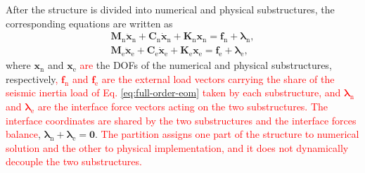 \documentclass[11pt,a4paper]{article}
\numberwithin{equation}{section}
\newcommand{\rev}[1]{\textcolor{red}{#1}}
\begin{document}
After the structure is divided into numerical and physical substructures, the corresponding equations are written as
\begin{subequations}
	\label{eq:substructure-eom}
	\begin{align}
		\mathbf{M}_{\mathrm{n}}\ddot{\bm{x}}_{\mathrm{n}}
		+\mathbf{C}_{\mathrm{n}}\dot{\bm{x}}_{\mathrm{n}}
		+\mathbf{K}_{\mathrm{n}}\bm{x}_{\mathrm{n}}
		=\bm{f}_{\mathrm{n}}{}+\bm{\lambda}_{\mathrm{n}},
		\label{eq:numerical-eom}\\
		\mathbf{M}_{\mathrm{e}}\ddot{\bm{x}}_{\mathrm{e}}
		+\mathbf{C}_{\mathrm{e}}\dot{\bm{x}}_{\mathrm{e}}
		+\mathbf{K}_{\mathrm{e}}\bm{x}_{\mathrm{e}}
		=\bm{f}_{\mathrm{e}}{}+\bm{\lambda}_{\mathrm{e}},
		\label{eq:physical-eom}
	\end{align}
\end{subequations}
where \(\bm{x}_{\mathrm{n}}\) and \(\bm{x}_{\mathrm{e}}\) \rev{are} the DOFs of the numerical and physical substructures, respectively\rev{, \(\bm{f}_{\mathrm{n}}\) and \(\bm{f}_{\mathrm{e}}\) are the external load vectors carrying the share of the seismic inertia load of Eq. \eqref{eq:full-order-eom} taken by each substructure, and \(\bm{\lambda}_{\mathrm{n}}\) and \(\bm{\lambda}_{\mathrm{e}}\) are the interface force vectors acting on the two substructures. The interface coordinates are shared by the two substructures and the interface forces balance}, \(\bm{\lambda}_{\mathrm{n}}+\bm{\lambda}_{\mathrm{e}}=\bm{0}\). \rev{The partition assigns one part of the structure to numerical solution and the other to physical implementation, and it does not dynamically decouple the two substructures.}
\end{document}
